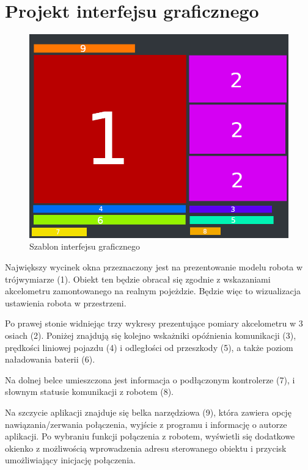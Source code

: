\documentclass[12pt,a4paper,polish]{article}
\begin{document}
  \newpage

  \section{Projekt interfejsu graficznego}
  \begin{figure}[ht]
    \centering
    \includegraphics[width=1\textwidth]{img/schemat2.png}
    \caption{Szablon interfejsu graficznego}
    \label{fig:interfejs}
  \end{figure}

  Największy wycinek okna przeznaczony jest na prezentowanie modelu
  robota w trójwymiarze (1). Obiekt ten będzie obracał się zgodnie z
  wskazaniami akcelometru zamontowanego na realnym pojeżdzie. Będzie
  więc to wizualizacja ustawienia robota w przestrzeni.

  Po prawej stonie widniejąc trzy wykresy prezentujące pomiary
  akcelometru w 3 osiach (2). Poniżej znajdują się kolejno wskażniki 
  opóźnienia  komunikacji (3), prędkości liniowej pojazdu (4) i odległości od
  przeszkody (5), a także poziom naładowania baterii (6).

  Na dolnej belce umieszczona jest informacja o podłączonym kontrolerze (7),
  i słownym statusie komunikacji z robotem (8).
  
  Na szczycie aplikacji znajduje się belka narzędziowa (9), która zawiera 
  opcję nawiązania/zerwania połączenia, wyjście z programu i informację
  o autorze aplikacji. Po wybraniu funkcji połączenia z robotem, 
  wyświetli się dodatkowe okienko z możliwością wprowadzenia adresu 
  sterowanego obiektu i przycisk umożliwiający inicjację połączenia.
  
\end{document}
